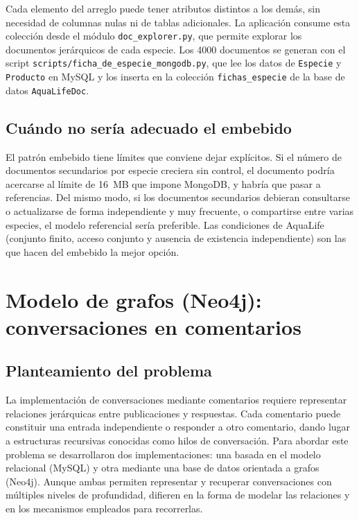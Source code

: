 \documentclass[11pt, a4paper]{article}
\begin{document}
Cada elemento del arreglo puede tener atributos distintos a los demás, sin necesidad de columnas nulas ni de tablas adicionales. La aplicación consume esta colección desde el módulo \texttt{doc\_explorer.py}, que permite explorar los documentos jerárquicos de cada especie. Los 4000 documentos se generan con el script \texttt{scripts/ficha\_de\_especie\_mongodb.py}, que lee los datos de \texttt{Especie} y \texttt{Producto} en MySQL y los inserta en la colección \texttt{fichas\_especie} de la base de datos \texttt{AquaLifeDoc}.

\subsection{Cuándo no sería adecuado el embebido}
El patrón embebido tiene límites que conviene dejar explícitos. Si el número de documentos secundarios por especie creciera sin control, el documento podría acercarse al límite de 16~MB que impone MongoDB, y habría que pasar a referencias. Del mismo modo, si los documentos secundarios debieran consultarse o actualizarse de forma independiente y muy frecuente, o compartirse entre varias especies, el modelo referencial sería preferible. Las condiciones de AquaLife (conjunto finito, acceso conjunto y ausencia de existencia independiente) son las que hacen del embebido la mejor opción.

\section{Modelo de grafos (Neo4j): conversaciones en comentarios}\label{sec:grafos}

\subsection{Planteamiento del problema}
La implementación de conversaciones mediante comentarios requiere representar relaciones jerárquicas entre publicaciones y respuestas. Cada comentario puede constituir una entrada independiente o responder a otro comentario, dando lugar a estructuras recursivas conocidas como hilos de conversación. Para abordar este problema se desarrollaron dos implementaciones: una basada en el modelo relacional (MySQL) y otra mediante una base de datos orientada a grafos (Neo4j). Aunque ambas permiten representar y recuperar conversaciones con múltiples niveles de profundidad, difieren en la forma de modelar las relaciones y en los mecanismos empleados para recorrerlas.
\end{document}
